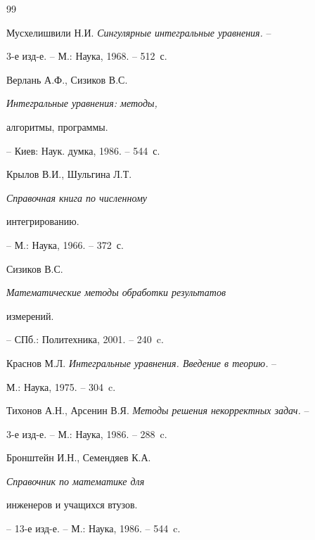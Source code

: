 \begin{thebibliography}{99}


Мусхелишвили Н.И. {\it Сингулярные интегральные уравнения.} --


3-е изд-е. -- М.: Наука, 1968. -- 512~с.







Верлань А.Ф., Сизиков В.С. {\it Интегральные уравнения: методы,


алгоритмы, программы.} -- Киев: Наук. думка, 1986. -- 544~с.







Крылов В.И., Шульгина Л.Т. {\it Справочная книга по численному


интегрированию.} -- М.: Наука, 1966. -- 372~с.







Сизиков В.С. {\it Математические методы обработки результатов


измерений.} -- СПб.: Политехника, 2001. -- 240~c.







Краснов М.Л. {\it Интегральные уравнения. Введение в теорию.} --


М.: Наука, 1975. -- 304~c.







Тихонов А.Н., Арсенин В.Я. {\it Методы решения некорректных задач.} --


3-е изд-е. -- М.: Наука, 1986. -- 288~c.







Бронштейн И.Н., Семендяев К.А. {\it Справочник по математике для


инженеров и учащихся втузов.} -- 13-е изд-е. -- М.: Наука, 1986. -- 544~c.





\end{thebibliography}





\vskip 2cm














\label{end}








